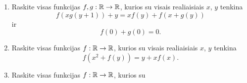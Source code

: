 \begin{enumerate}
  \item Raskite visas funkcijas $f,g:\mathbb R\to\mathbb R$, kurios su visais
    realiaisiais $x$, $y$ tenkina $$f(xg(y+1))+y=xf(y) + f(x+g(y))$$ ir
    $$f(0)+g(0)=0.$$
   \item Raskite visas funkcijas $f:\mathbb R\to\mathbb R$, kurios su visais realiaisiais
    $x$, $y$ tenkina $$f(x^2 + f(y)) = y + xf(x).$$
  \item \text{[IMO 1992]} Raskite visas funkcijas $f:\mathbb R\to\mathbb R$, kurios su

\end{enumerate}
